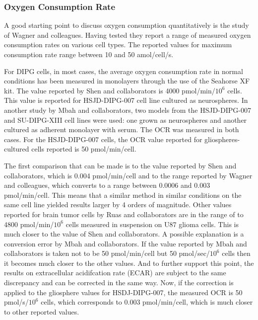 \documentclass[11pt,a4paper]{article}
\begin{document}
\subsubsection{Oxygen Consumption Rate}
A good starting point to discuss oxygen consumption quantitatively is the study of Wagner and colleagues.\cite{Wagner2011} Having tested they report a range of measured oxygen consumption rates on various cell types. The reported values for maximum consumption rate range between 10 and 50 amol/cell/s.

For DIPG cells, in most cases, the average oxygen consumption rate in normal conditions has been measured in monolayers through the use of the Seahorse XF kit.\cite{RomeroAgilent} The value reported by Shen and collaborators is 4000 pmol/min/$10^6$ cells. This value is reported for HSJD-DIPG-007 cell line cultured as neurospheres.\cite{Shen2019} In  another study by Mbah and collaborators, two models from the HSJD-DIPG-007 and SU-DIPG-XIII cell lines were used: one grown as neurospheres and another cultured as adherent monolayer with serum. The OCR was measured in both cases. For the HSJD-DIPG-007 cells, the OCR value reported for gliospheres-cultured cells reported is 50 pmol/min/cell. 

The first comparison that can be made is to the value reported by Shen and collaborators, which is 0.004 pmol/min/cell and to the range reported by Wagner and colleagues, which converts to a range between 0.0006 and 0.003 pmol/min/cell. This means that a similar method in similar conditions on the same cell line yielded results larger by 4 orders of magnitude. Other values reported for brain tumor cells by Ruas and collaborators are in the range of  to 4800 pmol/min/$10^6$ cells measured in suspension on U87 glioma cells.\cite{Ruas2018} This is much closer to the value of Shen and collaborators. A possible explanation is a conversion error by Mbah and collaborators. If the value reported by Mbah and collaborators is taken not to be 50 pmol/min/cell but 50 pmol/sec/$10^6$ cells then it becomes much closer to the other values. And to further support this point, the results on extracellular acidifcation rate (ECAR) are subject to the same discrepancy and can be corrected in the same way. Now, if the correction is applied to the gliosphere values for HSDJ-DIPG-007, the measured OCR is 50 pmol/s/$10^6$ cells, which corresponds to 0.003 pmol/min/cell, which is much closer to other reported values. 
\end{document}
